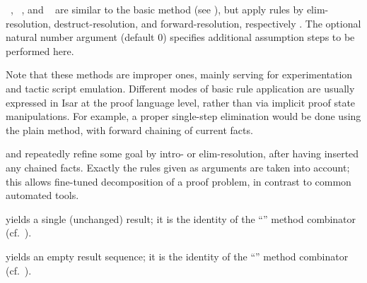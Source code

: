 \begin{isabellebody}
\begin{isamarkuptext}
\begin{description}
  \item \hyperlink{method.erule}{\mbox{}}~, \hyperlink{method.drule}{\mbox{}}~, and \hyperlink{method.frule}{\mbox{}}~ are similar to the basic \hyperlink{method.rule}{\mbox{}}
  method (see ), but apply rules by
  elim-resolution, destruct-resolution, and forward-resolution,
  respectively \cite{isabelle-implementation}.  The optional natural
  number argument (default 0) specifies additional assumption steps to
  be performed here.

  Note that these methods are improper ones, mainly serving for
  experimentation and tactic script emulation.  Different modes of
  basic rule application are usually expressed in Isar at the proof
  language level, rather than via implicit proof state manipulations.
  For example, a proper single-step elimination would be done using
  the plain \hyperlink{method.rule}{\mbox{}} method, with forward chaining of current
  facts.

  \item \hyperlink{method.intro}{\mbox{}} and \hyperlink{method.elim}{\mbox{}} repeatedly refine some goal
  by intro- or elim-resolution, after having inserted any chained
  facts.  Exactly the rules given as arguments are taken into account;
  this allows fine-tuned decomposition of a proof problem, in contrast
  to common automated tools.

  \item \hyperlink{method.succeed}{\mbox{}} yields a single (unchanged) result; it is
  the identity of the ``'' method combinator (cf.\
  ).

  \item \hyperlink{method.fail}{\mbox{}} yields an empty result sequence; it is the
  identity of the ``'' method combinator (cf.\
  ).


\end{description}
\end{isamarkuptext}
\end{isabellebody}
